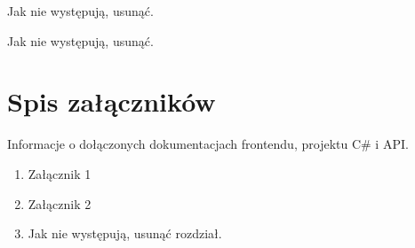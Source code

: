 \documentclass[a4paper,11pt,twoside]{report}
\theoremstyle{definition}
\begin{document}
\listoffigures
\thispagestyle{empty}
Jak nie występują, usunąć.


\renewcommand{\listtablename}{Spis tabel}
\listoftables
\thispagestyle{empty}
Jak nie występują, usunąć.



\chapter*{Spis załączników}

Informacje o dołączonych dokumentacjach frontendu, projektu C\# i API.

\begin{enumerate}
\item Załącznik 1
\item Załącznik 2
\item Jak nie występują, usunąć rozdział.
\end{enumerate}
\thispagestyle{empty}
\end{document}
